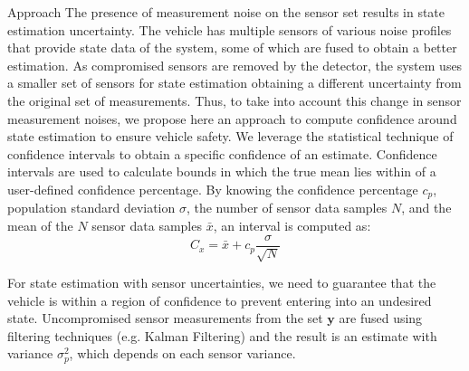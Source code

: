 \begin{section}{Approach}
The presence of measurement noise on the sensor set results in state estimation uncertainty. The vehicle has multiple sensors of various noise profiles that provide state data of the system, some of which are fused to obtain a better estimation. As compromised sensors are removed by the detector, the system uses a smaller set of sensors for state estimation obtaining a different uncertainty from the original set of measurements. Thus, to take into account this change in sensor measurement noises, we propose here an approach to compute confidence around state estimation to ensure vehicle safety. 
We leverage the statistical technique of confidence intervals \cite{devore2011probability} to obtain a specific confidence of an estimate. Confidence intervals are used to calculate bounds in which the true mean lies within of a user-defined confidence percentage. By knowing the confidence percentage $c_p$, population standard deviation $\sigma$, the number of sensor data samples $N$, and the mean of the $N$ sensor data samples $\bar{x}$, an interval is computed as:
    \begin{equation}
     \label{Confidence_interval}
		C_x = \bar{x} + c_p\frac{\sigma}{\sqrt{N}}
	\end{equation}
	
	
For state estimation with sensor uncertainties, we need to guarantee that the vehicle is within a region of confidence to prevent entering into an undesired state. Uncompromised sensor measurements from the set $\bm{y}$ are fused using filtering techniques (e.g. Kalman Filtering) and the result is an estimate with variance $\sigma_p^2$, which depends on each sensor variance. 


\end{section}
